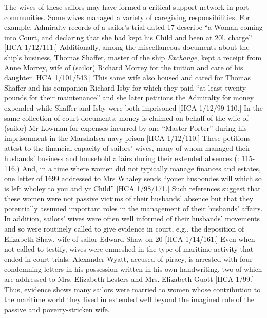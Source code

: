 The wives of these sailors may have formed a critical support network in port communities. Some wives managed a variety of caregiving responsibilities. For example, Admiralty records of a sailor’s trial dated 17 \citealt{December1687} describe “a Woman coming into Court, and declaring that she had kept his Child and been at 20l. charge” [HCA 1/12/111.] Additionally, among the miscellaneous documents about the ship’s business, Thomas Shaffer, master of the ship \textit{Exchange}, kept a receipt from Anne Morrey, wife of (sailor) Richard Morrey for the tuition and care of his daughter [HCA 1/101/543.] This same wife also housed and cared for Thomas Shaffer and his companion Richard Isby for which they paid “at least twenty pounds for their maintenance” and she later petitions the Admiralty for money expended while Shaffer and Isby were both imprisoned [HCA 1/12/99-110.] In the same collection of court documents, money is claimed on behalf of the wife of (sailor) Mr Lowman for expenses incurred by one “Master Porter” during his imprisonment in the Marshalsea navy prison [HCA 1/12/110.]  These petitions attest to the financial capacity of sailors’ wives, many of whom managed their husbands’ business and household affairs during their extended absences (\citealt{Jarvis2010}: 115-116.) And, in a time where women did not typically manage finances and estates, one letter of 1699 addressed to Mrs Whaley sends “youer husbondes will which so is left wholey to you and yr Child” [HCA 1/98/171.] Such references suggest that these women were not passive victims of their husbands’ absence but that they potentially assumed important roles in the management of their husbands’ affairs. In addition, sailors’ wives were often well informed of their husbands’ movements and so were routinely called to give evidence in court, e.g., the deposition of Elizabeth Shaw, wife of sailor Edward Shaw on 20 \citealt{July1699} [HCA 1/14/161.] Even when not called to testify, wives were enmeshed in the type of maritime activity that ended in court trials. Alexander Wyatt, accused of piracy, is arrested with four condemning letters in his possession written in his own handwriting, two of which are addressed to Mrs. Elizabeth Lesters and Mrs. Elizabeth Guott [HCA 1/99.] Thus, evidence shows many sailors were married to women whose contribution to the maritime world they lived in extended well beyond the imagined role of the passive and poverty-stricken wife. 


